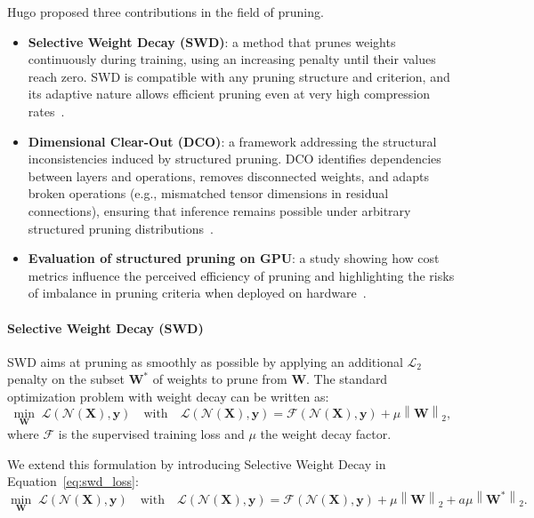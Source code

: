 \documentclass[11pt]{report}
\begin{document}
Hugo proposed three contributions in the field of pruning.
\begin{itemize}
  \item \textbf{Selective Weight Decay (SWD)}: a method that prunes weights continuously during training, using an increasing penalty until their values reach zero. SWD is compatible with any pruning structure and criterion, and its adaptive nature allows efficient pruning even at very high compression rates~\cite{tessier:hal-03675138}.
  \item \textbf{Dimensional Clear-Out (DCO)}: a framework addressing the structural inconsistencies induced by structured pruning. DCO identifies dependencies between layers and operations, removes disconnected weights, and adapts broken operations (e.g., mismatched tensor dimensions in residual connections), ensuring that inference remains possible under arbitrary structured pruning distributions~\cite{tessier:hal-03767634}.
  \item \textbf{Evaluation of structured pruning on GPU}: a study showing how cost metrics influence the perceived efficiency of pruning and highlighting the risks of imbalance in pruning criteria when deployed on hardware~\cite{tessier:hal-03767636}.
\end{itemize}

\paragraph{Selective Weight Decay (SWD)}


SWD aims at pruning as smoothly as possible by applying an additional $\mathcal{L}_2$ penalty on the subset $\mathbf{W}^*$ of weights to prune from $\mathbf{W}$.
The standard optimization problem with weight decay can be written as:
\begin{equation}\label{eq:loss}
  \min_{\mathbf{W}} \; \mathcal{L}(\mathcal{N}(\mathbf{X}), \mathbf{y})
  \quad \text{with} \quad
  \mathcal{L}(\mathcal{N}(\mathbf{X}), \mathbf{y}) = \mathcal{F}(\mathcal{N}(\mathbf{X}), \mathbf{y}) + \mu \left\| \mathbf{W} \right\|_2,
\end{equation}
where $\mathcal{F}$ is the supervised training loss and $\mu$ the weight decay factor.

We extend this formulation by introducing Selective Weight Decay in Equation~\ref{eq:swd_loss}:
\begin{equation}\label{eq:swd_loss}
  \min_{\mathbf{W}} \; \mathcal{L}(\mathcal{N}(\mathbf{X}), \mathbf{y})
  \quad \text{with} \quad
  \mathcal{L}(\mathcal{N}(\mathbf{X}), \mathbf{y}) = \mathcal{F}(\mathcal{N}(\mathbf{X}), \mathbf{y}) + \mu \left\| \mathbf{W} \right\|_2 + a \mu \left\| \mathbf{W}^* \right\|_2.
\end{equation}
\end{document}

